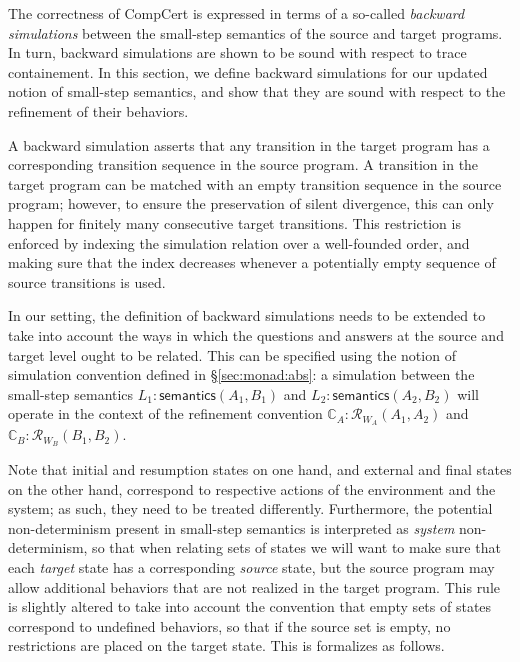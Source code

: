 \documentclass{article}
\newcommand{\kw}[1]{\ensuremath{ \mathsf{#1} }}
\begin{document}
The correctness of CompCert is expressed in terms of
a so-called \emph{backward simulations}
between the small-step semantics of the source and target programs.
In turn, backward simulations
are shown to be sound with respect to trace containement.
In this section,
we define backward simulations for our updated notion
of small-step semantics,
and show that they are sound with respect to
the refinement of their behaviors.

A backward simulation asserts that any transition in the target program
has a corresponding transition sequence in the source program.
A transition in the target program can be matched with
an empty transition sequence in the source program;
however, to ensure the preservation of silent divergence,
this can only happen for finitely many consecutive target transitions.
This restriction is enforced by indexing the simulation relation
over a well-founded order,
and making sure that the index decreases
whenever a potentially empty sequence of source transitions is used.

In our setting,
the definition of backward simulations needs to be extended
to take into account the ways in which the questions and answers
at the source and target level ought to be related.
This can be specified using the notion of simulation convention
defined in \S\ref{sec:monad:abs}:
a simulation between the small-step semantics
$L_1 : \kw{semantics}(A_1, B_1)$ and
$L_2 : \kw{semantics}(A_2, B_2)$ will
operate in the context of the refinement convention
$\mathbb{C}_A : \mathcal{R}_{W_A}(A_1, A_2)$ and
$\mathbb{C}_B : \mathcal{R}_{W_B}(B_1, B_2)$.

Note that initial and resumption states on one hand,
and external and final states on the other hand,
correspond to respective actions of the environment and the system;
as such, they need to be treated differently.
Furthermore,
the potential non-determinism present in small-step semantics
is interpreted as \emph{system} non-determinism,
so that when relating sets of states
we will want to make sure that
each \emph{target} state has a corresponding \emph{source} state,
but the source program may allow additional behaviors
that are not realized in the target program.
This rule is slightly altered to take into account the convention that
empty sets of states correspond to undefined behaviors,
so that if the source set is empty,
no restrictions are placed on the target state.
This is formalizes as follows.
\end{document}
